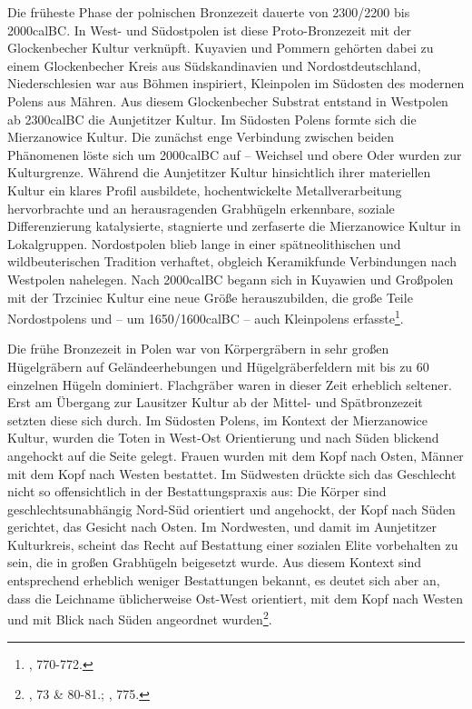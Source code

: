 \documentclass[openany,twoside,twocolumn]{book}
\let\rmarkdownfootnote\footnote%
\def\footnote{\protect\rmarkdownfootnote}
\begin{document}
Die früheste Phase der polnischen Bronzezeit dauerte von 2300/2200 bis 2000calBC. In West- und Südostpolen ist diese Proto-Bronzezeit mit der Glockenbecher Kultur verknüpft. Kuyavien und Pommern gehörten dabei zu einem Glockenbecher Kreis aus Südskandinavien und Nordostdeutschland, Niederschlesien war aus Böhmen inspiriert, Kleinpolen im Südosten des modernen Polens aus Mähren. Aus diesem Glockenbecher Substrat entstand in Westpolen ab 2300calBC die Aunjetitzer Kultur. Im Südosten Polens formte sich die Mierzanowice Kultur. Die zunächst enge Verbindung zwischen beiden Phänomenen löste sich um 2000calBC auf -- Weichsel und obere Oder wurden zur Kulturgrenze. Während die Aunjetitzer Kultur hinsichtlich ihrer materiellen Kultur ein klares Profil ausbildete, hochentwickelte Metallverarbeitung hervorbrachte und an herausragenden Grabhügeln erkennbare, soziale Differenzierung katalysierte, stagnierte und zerfaserte die Mierzanowice Kultur in Lokalgruppen. Nordostpolen blieb lange in einer spätneolithischen und wildbeuterischen Tradition verhaftet, obgleich Keramikfunde Verbindungen nach Westpolen nahelegen. Nach 2000calBC begann sich in Kuyawien und Großpolen mit der Trzciniec Kultur eine neue Größe herauszubilden, die große Teile Nordostpolens und -- um 1650/1600calBC -- auch Kleinpolens erfasste\footnote{\textcite{czebreszuk_bronze_2013}, 770-772.}.

Die frühe Bronzezeit in Polen war von Körpergräbern in sehr großen Hügelgräbern auf Geländeerhebungen und Hügelgräberfeldern mit bis zu 60 einzelnen Hügeln dominiert. Flachgräber waren in dieser Zeit erheblich seltener. Erst am Übergang zur Lausitzer Kultur ab der Mittel- und Spätbronzezeit setzten diese sich durch. Im Südosten Polens, im Kontext der Mierzanowice Kultur, wurden die Toten in West-Ost Orientierung und nach Süden blickend angehockt auf die Seite gelegt. Frauen wurden mit dem Kopf nach Osten, Männer mit dem Kopf nach Westen bestattet. Im Südwesten drückte sich das Geschlecht nicht so offensichtlich in der Bestattungspraxis aus: Die Körper sind geschlechtsunabhängig Nord-Süd orientiert und angehockt, der Kopf nach Süden gerichtet, das Gesicht nach Osten. Im Nordwesten, und damit im Aunjetitzer Kulturkreis, scheint das Recht auf Bestattung einer sozialen Elite vorbehalten zu sein, die in großen Grabhügeln beigesetzt wurde. Aus diesem Kontext sind entsprechend erheblich weniger Bestattungen bekannt, es deutet sich aber an, dass die Leichname üblicherweise Ost-West orientiert, mit dem Kopf nach Westen und mit Blick nach Süden angeordnet wurden\footnote{\textcite{dabrowski_aeltere_2004}, 73 \& 80-81.; \textcite{czebreszuk_bronze_2013}, 775.}.
\end{document}
